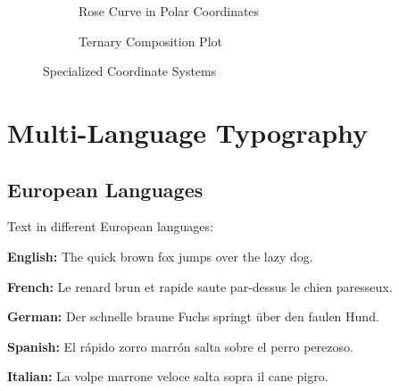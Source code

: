 \documentclass[12pt,a4paper,twoside]{article}
\theoremstyle{definition}
\begin{document}
\begin{figure}[H]
\centering
\begin{subfigure}{0.48\textwidth}
\centering
{}
\caption{Rose Curve in Polar Coordinates}
\end{subfigure}
\hfill
\begin{subfigure}{0.48\textwidth}
\centering
{}
\caption{Ternary Composition Plot}
\end{subfigure}
\caption{Specialized Coordinate Systems}
\label{fig:specialized-plots}
\end{figure}

\section{Multi-Language Typography}

\subsection{European Languages}

Text in different European languages:

\textbf{English:} The quick brown fox jumps over the lazy dog.

\textbf{French:} Le renard brun et rapide saute par-dessus le chien paresseux.

\textbf{German:} Der schnelle braune Fuchs springt über den faulen Hund.

\textbf{Spanish:} El rápido zorro marrón salta sobre el perro perezoso.

\textbf{Italian:} La volpe marrone veloce salta sopra il cane pigro.
\end{document}

